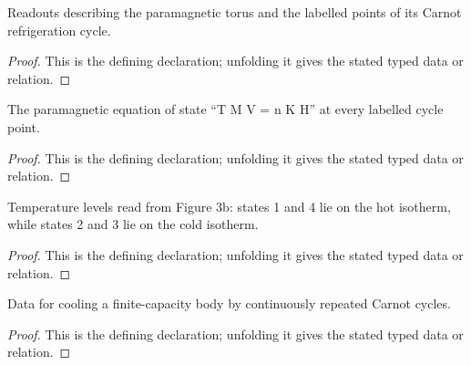 \begin{definition}[ParamagneticCarnotCycle]
  \label{decl:physics:IPhO_2026_3_C_4:ParamagneticCarnotCycle}
  Readouts describing the paramagnetic torus and the labelled points of its Carnot refrigeration cycle.
\end{definition}
\begin{proof}
  This is the defining declaration; unfolding it gives the stated typed data or relation.
\end{proof}

\begin{definition}[ObeysParamagneticEquationOfState]
  \label{decl:physics:IPhO_2026_3_C_4:ObeysParamagneticEquationOfState}
  The paramagnetic equation of state “T M V = n K H” at every labelled cycle point.
\end{definition}
\begin{proof}
  This is the defining declaration; unfolding it gives the stated typed data or relation.
\end{proof}

\begin{definition}[FollowsFigureThreeB]
  \label{decl:physics:IPhO_2026_3_C_4:FollowsFigureThreeB}
  Temperature levels read from Figure 3b: states 1 and 4 lie on the hot isotherm, while states 2 and 3 lie on the cold isotherm.
\end{definition}
\begin{proof}
  This is the defining declaration; unfolding it gives the stated typed data or relation.
\end{proof}

\begin{definition}[ContinuousCoolingRun]
  \label{decl:physics:IPhO_2026_3_C_4:ContinuousCoolingRun}
  Data for cooling a finite-capacity body by continuously repeated Carnot cycles.
\end{definition}
\begin{proof}
  This is the defining declaration; unfolding it gives the stated typed data or relation.
\end{proof}

